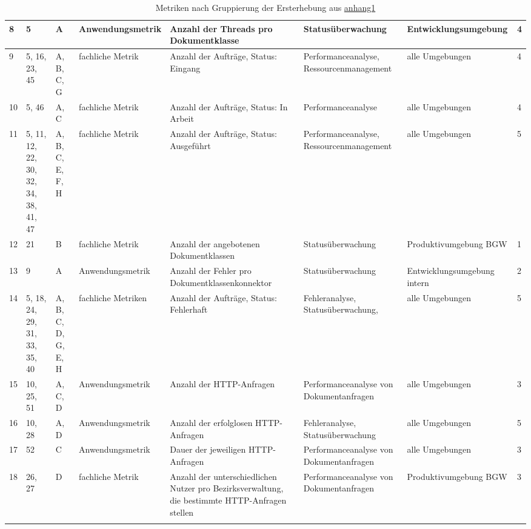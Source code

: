 \begin{landscape}
\begin{longtable}{|p{}|p{}|p{}|p{}|p{}|p{}|p{}|p{}|}
        8 & 5 & A & Anwendungsmetrik & Anzahl der Threads pro Dokumentklasse & Statusüberwachung & Entwicklungsumgebung & 4 \\ \hline
        9 & 5, 16, 23, 45 & A, B, C, G & fachliche Metrik & Anzahl der Aufträge, Status: Eingang & Performanceanalyse, Ressourcenmanagement & alle Umgebungen & 4 \\ \hline
        10 & 5, 46 & A, C & fachliche Metrik & Anzahl der Aufträge, Status: In Arbeit & Performanceanalyse & alle Umgebungen & 4 \\ \hline
        11 & 5, 11, 12, 22, 30, 32, 34, 38, 41, 47 & A, B, C, E, F, H & fachliche Metrik & Anzahl der Aufträge, Status: Ausgeführt & Performanceanalyse, Ressourcenmanagement & alle Umgebungen & 5 \\ \hline
        12 & 21 & B & fachliche Metrik & Anzahl der angebotenen Dokumentklassen & Statusüberwachung & Produktivumgebung BGW & 1 \\ \hline
        13 & 9 & A & Anwendungsmetrik & Anzahl der Fehler pro Dokumentklassenkonnektor & Statusüberwachung & Entwicklungsumgebung intern & 2 \\ \hline
        14 & 5, 18, 24, 29, 31, 33, 35, 40 & A, B, C, D, G, E, H & fachliche Metriken & Anzahl der Aufträge, Status: Fehlerhaft & Fehleranalyse, Statusüberwachung,  & alle Umgebungen & 5 \\ \hline
        15 & 10, 25, 51 & A, C, D & Anwendungsmetrik & Anzahl der HTTP-Anfragen & Performanceanalyse von Dokumentanfragen & alle Umgebungen & 3 \\ \hline
        16 & 10, 28 & A, D & Anwendungsmetrik & Anzahl der erfolglosen HTTP-Anfragen & Fehleranalyse, Statusüberwachung & alle Umgebungen & 5 \\ \hline
        17 & 52 & C & Anwendungsmetrik & Dauer der jeweiligen HTTP-Anfragen & Performanceanalyse von Dokumentanfragen & alle Umgebungen & 3 \\ \hline
        18 & 26, 27 & D & fachliche Metrik & Anzahl der unterschiedlichen Nutzer pro Bezirksverwaltung, die bestimmte HTTP-Anfragen stellen & Performanceanalyse von Dokumentanfragen & Produktivumgebung BGW & 3 \\ \hline
    \caption{Metriken nach Gruppierung der Ersterhebung aus \protect\hyperlink{Anhang 1}{anhang1}}
    \label{tab:metrikenNachGruppierung}
    \end{longtable}

\end{landscape}

\fi